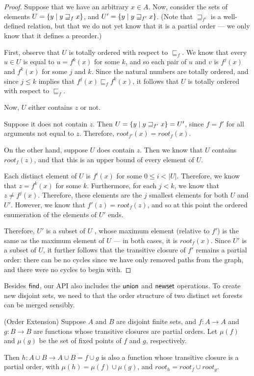 \begin{proof}
Suppose that we have an arbitrary $x \in A$. Now, consider the sets of
elements $U = \{{{y}\;|\;{y \sqsupseteq_f x}}\}$, and $U' =
\{{{y}\;|\;{y \sqsupseteq_{f'} x}}\}$. (Note that $\sqsupseteq_{f'}$
is a well-defined relation, but that we do not yet know that it is a
partial order --- we only know that it defines a preorder.)

First, observe that $U$ is totally ordered with respect to
$\sqsubseteq_f$. We know that every $u \in U$ is equal to $u
= f^k(x)$ for some $k$, and so each pair of $u$ and $v$ is $f^j(x)$
and $f^k(x)$ for some $j$ and $k$. Since the natural numbers are
totally ordered, and since $j \leq k$ implies that $f^j(x)
\sqsubseteq_f f^k(x)$, it follows that $U$ is totally ordered with
respect to $\sqsubseteq_f$.

Now, $U$ either contains $z$ or not.

Suppose it does not contain $z$. Then $U = \{{{y}\;|\;{y
  \sqsupseteq_{f'} x}}\} = U'$, since $f = f'$ for all arguments not
equal to $z$. Therefore, $\mathit{root}_{f'}(x) = \mathit{root}_f(x)$.

On the other hand, suppose $U$ does contain $z$. Then we know that $U$
contains $\mathit{root}_f(z)$, and that this is an upper bound of
every element of $U$. 

Each distinct element of $U$ is $f^i(x)$ for some $0 \leq i <
|U|$. Therefore, we know that $z = f^k(x)$ for some $k$. Furthermore,
for each $j < k$, we know that $z \not= f^j(x)$. Therefore, these
elements are the $j$ smallest elements for both $U$ and $U'$. However,
we know that $f'(z) = \mathit{root}_f(z)$, and so at this point the
ordered enumeration of the elements of $U'$ ends.

Therefore, $U'$ is a subset of $U$ , whose maximum element (relative
to $f'$) is the same as the maximum element of $U$ --- in both cases,
it is $\mathit{root}_f(x)$. Since $U'$ is a subset of $U$, it further
follows that the transitive closure of $f'$ remains a partial
order: there can be no cycles since we have only removed paths from
the graph, and there were no cycles to begin with.
\end{proof}

Besides $\mathsf{find}$, our API also includes the $\mathsf{union}$ and $\mathsf{newset}$ operations. 
To create new disjoint sets, we need to that the order structure of two distinct
set forests can be merged sensibly. 

\begin{lemma}{(Order Extension)}
Suppose $A$ and $B$ are disjoint finite sets, and $f : A \to A$ and $g
: B \to B$ are functions whose transitive closures are partial
orders. Let $\mu(f)$ and $\mu(g)$ be the set of fixed points of $f$
and $g$, respectively. 

Then $h : A \cup B \to A \cup B = f \cup g$ is also a function whose 
transitive closure is a partial order, with $\mu(h) = \mu(f) \cup \mu(g)$, 
and $\mathit{root}_h = \mathit{root}_f \cup \mathit{root}_g$. 
\end{lemma}


